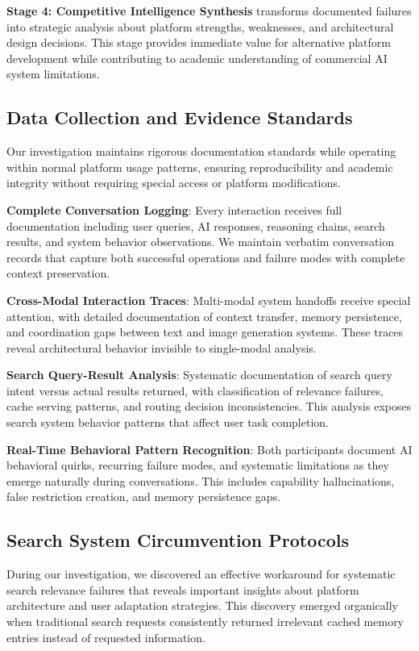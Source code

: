 \documentclass[12pt]{article}
\begin{document}
\textbf{Stage 4: Competitive Intelligence Synthesis} transforms documented failures into strategic analysis about platform strengths, weaknesses, and architectural design decisions. This stage provides immediate value for alternative platform development while contributing to academic understanding of commercial AI system limitations.

\subsection{Data Collection and Evidence Standards}

Our investigation maintains rigorous documentation standards while operating within normal platform usage patterns, ensuring reproducibility and academic integrity without requiring special access or platform modifications.

\textbf{Complete Conversation Logging}: Every interaction receives full documentation including user queries, AI responses, reasoning chains, search results, and system behavior observations. We maintain verbatim conversation records that capture both successful operations and failure modes with complete context preservation.

\textbf{Cross-Modal Interaction Traces}: Multi-modal system handoffs receive special attention, with detailed documentation of context transfer, memory persistence, and coordination gaps between text and image generation systems. These traces reveal architectural behavior invisible to single-modal analysis.

\textbf{Search Query-Result Analysis}: Systematic documentation of search query intent versus actual results returned, with classification of relevance failures, cache serving patterns, and routing decision inconsistencies. This analysis exposes search system behavior patterns that affect user task completion.

\textbf{Real-Time Behavioral Pattern Recognition}: Both participants document AI behavioral quirks, recurring failure modes, and systematic limitations as they emerge naturally during conversations. This includes capability hallucinations, false restriction creation, and memory persistence gaps.

\subsection{Search System Circumvention Protocols}

During our investigation, we discovered an effective workaround for systematic search relevance failures that reveals important insights about platform architecture and user adaptation strategies. This discovery emerged organically when traditional search requests consistently returned irrelevant cached memory entries instead of requested information.
\end{document}
